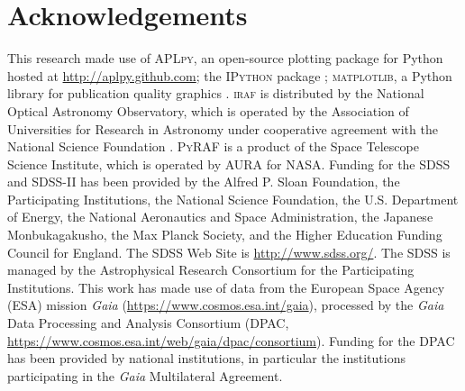 \documentclass[apj, revtex4]{emulateapj}
\begin{document}
\section*{Acknowledgements} This research made use of \textsc{APLpy}, an open-source plotting package for Python hosted at \url{http://aplpy.github.com}; the \textsc{IPython} package \citep{Perez2007}; \textsc{matplotlib}, a Python library for publication quality graphics \citep{Hunter2007}. \textsc{iraf} is distributed by the National Optical Astronomy Observatory, which is operated by the Association of Universities for Research in Astronomy under cooperative agreement with the National Science Foundation \citep{Tody1993}. \textsc{PyRAF} is a product of the Space Telescope Science Institute, which is operated by AURA for NASA. Funding for the SDSS and SDSS-II has been provided by the Alfred P. Sloan Foundation, the Participating Institutions, the National Science Foundation, the U.S. Department of Energy, the National Aeronautics and Space Administration, the Japanese Monbukagakusho, the Max Planck Society, and the Higher Education Funding Council for England. The SDSS Web Site is \url{http://www.sdss.org/}. The SDSS is managed by the Astrophysical Research Consortium for the Participating Institutions. This work has made use of data from the European Space Agency (ESA) mission {\it Gaia} (\url{https://www.cosmos.esa.int/gaia}), processed by the {\it Gaia} Data Processing and Analysis Consortium (DPAC, \url{https://www.cosmos.esa.int/web/gaia/dpac/consortium}). Funding for the DPAC has been provided by national institutions, in particular the institutions participating in the {\it Gaia} Multilateral Agreement.





\appendix
\end{document}

